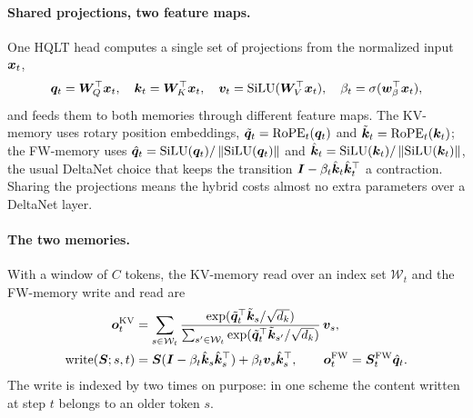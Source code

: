 \paragraph{Shared projections, two feature maps.} One HQLT head computes a single set of
projections from the normalized input $\bm{x}_t$,
\begin{equation}\label{eq:c12-hqlt-proj}
  \bm{q}_t = \bm{W}_Q^{\top}\bm{x}_t,\quad \bm{k}_t = \bm{W}_K^{\top}\bm{x}_t,\quad \bm{v}_t = \operatorname{SiLU}(\bm{W}_V^{\top}\bm{x}_t),\quad
  \beta_t = \sigma(\bm{w}_\beta^{\top}\bm{x}_t),
\end{equation}
and feeds them to both memories through different feature maps. The KV-memory uses rotary
position embeddings, $\tilde{\bm{q}}_t = \mathrm{RoPE}_t(\bm{q}_t)$ and $\tilde{\bm{k}}_t =
\mathrm{RoPE}_t(\bm{k}_t)$; the FW-memory uses $\hat{\bm{q}}_t = \operatorname{SiLU}(\bm{q}_t)/\left\lVert \operatorname{SiLU}(\bm{q}_t)\right\rVert$ and
$\hat{\bm{k}}_t = \operatorname{SiLU}(\bm{k}_t)/\left\lVert \operatorname{SiLU}(\bm{k}_t)\right\rVert$, the usual DeltaNet choice that keeps the
transition $\bm{I}-\beta_t\hat{\bm{k}}_t\hat{\bm{k}}_t^{\top}$ a contraction. Sharing the projections means the
hybrid costs almost no extra parameters over a DeltaNet layer.

\paragraph{The two memories.} With a window of $C$ tokens, the KV-memory read over an index set
$\mathcal{W}_t$ and the FW-memory write and read are
\begin{align}
  \bm{o}^{\mathrm{KV}}_t &= \sum_{s\in\mathcal{W}_t}
     \frac{\exp(\tilde{\bm{q}}_t^{\top}\tilde{\bm{k}}_s/\sqrt{d_k})}{\sum_{s'\in\mathcal{W}_t}\exp(\tilde{\bm{q}}_t^{\top}\tilde{\bm{k}}_{s'}/\sqrt{d_k})}\,\bm{v}_s,
     \label{eq:c12-hqlt-kv}\\
  \mathrm{write}(\bm{S}; s, t) &= \bm{S}(\bm{I}-\beta_t\hat{\bm{k}}_s\hat{\bm{k}}_s^{\top}) + \beta_t\bm{v}_s\hat{\bm{k}}_s^{\top},
     \qquad \bm{o}^{\mathrm{FW}}_t = \bm{S}^{\mathrm{FW}}_t\hat{\bm{q}}_t .\label{eq:c12-hqlt-fw}
\end{align}
The write is indexed by two times on purpose: in one scheme the content written at step $t$
belongs to an older token $s$.

